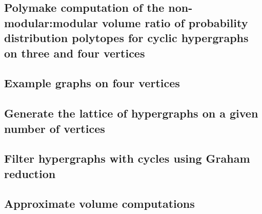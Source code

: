 \subsection{Polymake computation of the non-modular:modular volume ratio of probability distribution polytopes for cyclic hypergraphs on three and four vertices}

\pagebreak

\subsection{Example graphs on four vertices}

\pagebreak

\subsection{Generate the lattice of hypergraphs on a given number of vertices}

\pagebreak

\subsection{Filter hypergraphs with cycles using Graham reduction}

\pagebreak

\subsection{Approximate volume computations}

